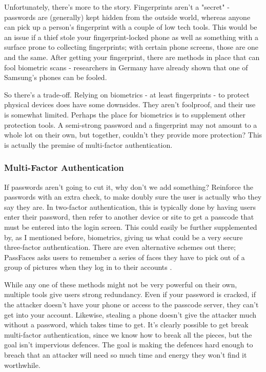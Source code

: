 \documentclass[12pt]{apa6}
\begin{document}
Unfortunately, there's more to the story. Fingerprints aren't a "secret" - passwords are (generally) kept hidden from the outside world, whereas anyone can pick up a person's fingerprint with a couple of low tech tools. This would be an issue if a thief stole your fingerprint-locked phone as well as something with a surface prone to collecting fingerprints; with certain phone screens, those are one and the same. After getting your fingerprint, there are methods in place that can fool biometric scans - researchers in Germany have already shown that one of Samsung's phones can be fooled. \parencite{eadic14}

So there's a trade-off. Relying on biometrics - at least fingerprints - to protect physical devices does have some downsides. They aren't foolproof, and their use is somewhat limited. Perhaps the place for biometrics is to supplement other protection tools. A semi-strong password and a fingerprint may not amount to a whole lot on their own, but together, couldn't they provide more protection? This is actually the premise of multi-factor authentication.

\subsubsection{Multi-Factor Authentication}
If passwords aren't going to cut it, why don't we add something? Reinforce the passwords with an extra check, to make doubly sure the user is actually who they say they are. In two-factor authentication, this is typically done by having users enter their password, then refer to another device or site to get a passcode that must be entered into the login screen. This could easily be further supplemented by, as I mentioned before, biometrics, giving us what could be a very secure three-factor authentication. There are even alternative schemes out there; PassFaces asks users to remember a series of faces they have to pick out of a group of pictures when they log in to their accounts \parencite{tanaka12}.

While any one of these methods might not be very powerful on their own, multiple tools give users strong redundancy. Even if your password is cracked, if the attacker doesn't have your phone or access to the passcode server, they can't get into your account. Likewise, stealing a phone doesn't give the attacker much without a password, which takes time to get. It's clearly possible to get break multi-factor authentication, since we know how to break all the pieces, but the goal isn't impervious defences. The goal is making the defences hard enough to breach that an attacker will need so much time and energy they won't find it worthwhile.
\end{document}
